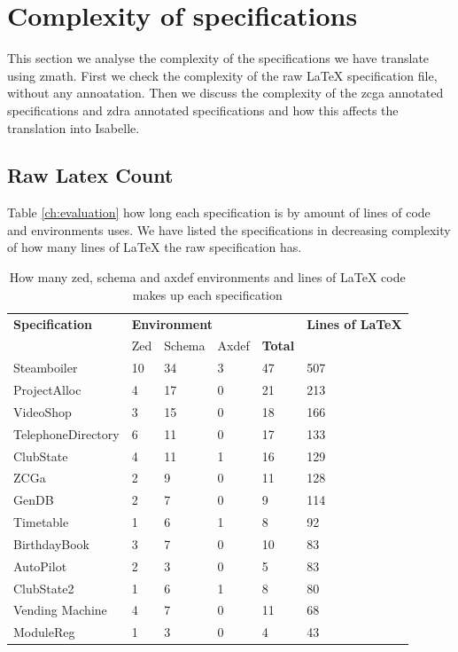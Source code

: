 \section{Complexity of specifications}

This section we analyse the complexity of the specifications we have translate using \gls{zmath}. First we check the complexity of the raw \LaTeX{} specification file, without any annoatation. Then we discuss the complexity of the \gls{zcga} annotated specifications and \gls{zdra} annotated specifications and how this affects the translation into Isabelle.

\subsection{Raw Latex Count}

Table \ref{ch:evaluation} how long each specification is by amount of lines of code and environments uses. We have listed the specifications in decreasing complexity of how many lines of \LaTeX{} the raw specification has.

\begin{table}[H]
\centering
\begin{tabular}{|l |l | l |l |l|| l|}
\hline
\textbf{Specification} & \multicolumn{4}{l||}{\textbf{Environment}} & \textbf{Lines of \LaTeX} \\
\cline{2-5}
& Zed & Schema & Axdef & \textbf{Total} & \\
\hline
Steamboiler & 10 & 34 & 3 & 47 & 507 \\
ProjectAlloc & 4 & 17 & 0 & 21 & 213 \\
VideoShop & 3 & 15 & 0 & 18 & 166 \\
TelephoneDirectory & 6 & 11 & 0 & 17& 133 \\
ClubState & 4 & 11 & 1 & 16 &129 \\
ZCGa & 2 & 9 & 0 & 11 & 128 \\
GenDB & 2 & 7 & 0 & 9 & 114 \\
Timetable & 1 & 6 & 1 & 8 & 92 \\
BirthdayBook & 3 & 7 & 0 & 10 & 83 \\
AutoPilot & 2 & 3 & 0 & 5 & 83 \\
ClubState2 & 1 & 6 & 1 & 8 & 80 \\
Vending Machine & 4 & 7 & 0 & 11 & 68 \\
ModuleReg & 1 & 3 & 0 & 4 & 43 \\
\hline
\end{tabular}
\caption{How many zed, schema and axdef environments and lines of \LaTeX{} code makes up each specification \label{tab:numbersspec}}
\end{table}

